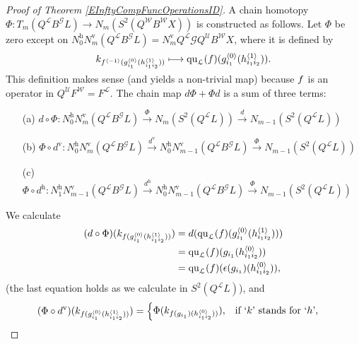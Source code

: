 \documentclass[11pt]{amsart} \renewcommand{\baselinestretch}{1.2}
\theoremstyle{plain}
\numberwithin{equation}{section} %
\theoremstyle{plain}
\numberwithin{equation}{chapter} %
\renewcommand{\to}{\longrightarrow}
\newcommand{\squishlist}{
  \setlength{\itemsep}{.5pt}
  \setlength{\parskip}{0pt}
  \setlength{\parsep}{0pt}}
\newcommand{\scrG}{\mathscr{G}}
\newcommand{\calU}{\mathcal{U}}
\newcommand{\calL}{\mathcal{L}}
\newcommand{\calw}{\mathcal{W}}
\newcommand{\call}{\mathcal{L}}
\newcommand{\BSW}{{\scrG}}
\newcommand{\BSWres}{B^\BSW}%
\newcommand{\quadratic}{\mathrm{qu}}
\newcommand{\uver}{^\mathrm{v}}
\newcommand{\uhor}{^\mathrm{h}}
\renewcommand{\mapsto}{\longmapsto}
\begin{document}
\begin{Operations in composite functor spectral sequences}
\begin{proof}[Proof of Theorem \ref{EInftyCompFuncOperationsID}]
A chain homotopy $\Phi:T_m(Q^{\calL}\BSWres L)\to N_m(S^2(Q^{\calw}B^{\calw}X))$ is constructed as follows. Let $\Phi$ be zero except on 
$N\uhor_0N\uver_m (Q^{\call}\BSWres L)=N\uver_mQ^{\calL}\BSW Q^{\calU}B^{\calw}X$,
where it is defined by
\[\smash{k_{f^{\langle -1\rangle}(g^{\smash{\langle} 0\smash{\rangle}}_{i_1}(h^{\smash{\langle} 1\smash{\rangle}}_{i_1i_2}))}}\mapsto {\quadratic_\call}(f)(g^{\smash{\langle} 0\smash{\rangle}}_{i_1}(h^{\smash{\langle} 1\smash{\rangle}}_{i_1i_2})).\]
This definition makes sense (and yields a non-trivial map) because $f\relax $ is an operator in $Q^{\calU}F^{\calw}=F^{\calL}$.
The chain map $d\Phi+\Phi d$ is a sum of three terms:
\begin{enumerate}\squishlist
\setlength{\parindent}{.25in}
\item[(a)] $d\circ\Phi:N\uhor_0N\uver_m (Q^{\call}\BSWres L)\overset{\Phi}{\to} N_m(S^2(Q^{\call}L))\overset{d}{\to} N_{m-1}(S^2(Q^{\call}L))$ 
\item[(b)] $\Phi\circ d\uver:N\uhor_0N\uver_{m} (Q^{\call}\BSWres L)\overset{d\uver}{\to} N\uhor_0N\uver_{m-1}(Q^{\call}\BSWres L)\overset{\Phi}{\to} N_{m-1}(S^2(Q^{\call}L))$
\item[(c)] $\Phi\circ d\uhor:N\uhor_1N\uver_{m-1}(Q^{\call}\BSWres L)\overset{d\uhor}{\to} N\uhor_0N\uver_{m-1}(Q^{\call}\BSWres L)\overset{\Phi}{\to} N_{m-1}(S^2(Q^{\call}L))$
\end{enumerate}
We calculate
\begin{alignat*}{2}
(d\circ\Phi)(k_{f\relax (g^{\smash{\langle} 0\smash{\rangle}}_{i_1}(h^{\smash{\langle} 1\smash{\rangle}}_{i_1i_2}))})&=d( {\quadratic_\call}(f)(g^{\smash{\langle} 0\smash{\rangle}}_{i_1}(h^{\smash{\langle} 1\smash{\rangle}}_{i_1i_2})))\\
&={\quadratic_\call}(f)(g\relax _{i_1}(h^{\smash{\langle} 0\smash{\rangle}}_{i_1i_2}))\\
&={\quadratic_\call}(f)(\epsilon(g\relax _{i_1})(h^{\smash{\langle} 0\smash{\rangle}}_{i_1i_2})),
\end{alignat*}
(the last equation holds as we calculate in $S^2(Q^{\call}L)$), and 
\begin{alignat*}{2}
(\Phi\circ d\uver)(k_{f\relax (g^{\smash{\langle} 0\smash{\rangle}}_{i_1}(h^{\smash{\langle} 1\smash{\rangle}}_{i_1i_2}))})&=\begin{cases}
\Phi( k_{f\relax (g\relax _{i_1})(h^{\smash{\langle} 0\smash{\rangle}}_{i_1i_2}))}),&\textup{if `$k$' stands for `$h$'},\\

\end{cases}
\end{alignat*}
\end{proof}
\end{Operations in composite functor spectral sequences}
\end{document}
